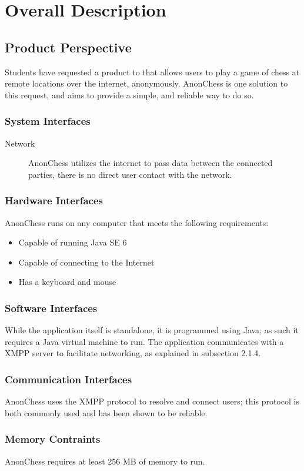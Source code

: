 \section{Overall Description}

\subsection{Product Perspective}
Students have requested a product to that allows users to play a game of chess at remote locations over the internet, anonymously. AnonChess is one solution to this request, and aims to provide a simple, and reliable way to do so.
\subsubsection{System Interfaces}
\begin{description}
\item[Network] AnonChess utilizes the internet to pass data between the connected parties, there is no direct user contact with the network.
\end{description}
\subsubsection{Hardware Interfaces}
AnonChess runs on any computer that meets the following requirements: 
\begin{itemize}
\item{Capable of running Java SE 6}
\item{Capable of connecting to the Internet}
\item{Has a keyboard and mouse}
\end{itemize}
\subsubsection{Software Interfaces}
 While the application itself is standalone, it is programmed using Java; as such it requires a Java virtual machine to run. The application communicates with a XMPP server to facilitate networking, as explained in subsection 2.1.4.
\subsubsection{Communication Interfaces}
AnonChess uses the XMPP protocol to resolve and connect users; this protocol is both commonly used and has been shown to be reliable.
\subsubsection{Memory Contraints}
AnonChess requires at least 256 MB of memory to run.
